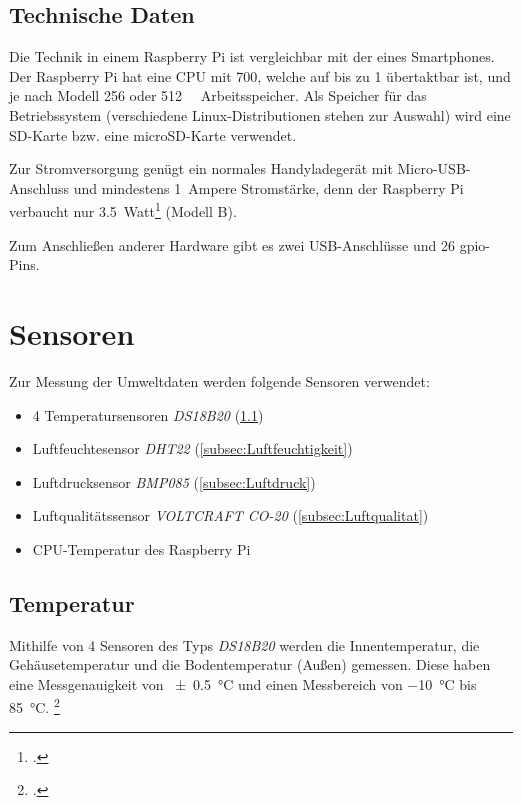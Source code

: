 \subsection{Technische Daten}
\label{subsec:Technische Daten}
Die Technik in einem Raspberry Pi ist vergleichbar mit der eines Smartphones. Der Raspberry Pi hat eine \gls{CPU} mit \SI{700}{}, welche auf bis zu \SI{1}{} übertaktbar ist, und je nach Modell \SI{256}{} oder \SI{512}{\mega\byte} Arbeitsspeicher. Als Speicher für das Betriebssystem (verschiedene Linux-Distributionen stehen zur Auswahl) wird eine SD-Karte bzw. eine microSD-Karte verwendet.

Zur Stromversorgung genügt ein normales Handyladegerät mit Micro-USB-Anschluss und mindestens \SI{1}{\gls{Ampere}} Stromstärke, denn der Raspberry Pi verbaucht nur \SI{3.5}{Watt}\footcite{strom} (Modell B).

Zum Anschließen anderer Hardware gibt es zwei USB-Anschlüsse und 26 \gls{gpio}-Pins.

\section{Sensoren}
\label{sec:Sensoren}

Zur Messung der Umweltdaten werden folgende Sensoren verwendet:
\begin{itemize}
\item 4 Temperatursensoren \emph{DS18B20} (\ref{subsec:Temperatur})
\item Luftfeuchtesensor \emph{DHT22} (\ref{subsec:Luftfeuchtigkeit})
\item Luftdrucksensor \emph{BMP085} (\ref{subsec:Luftdruck})
\item Luftqualitätssensor \emph{VOLTCRAFT CO-20} (\ref{subsec:Luftqualitat})
\item CPU-Temperatur des Raspberry Pi
\end{itemize}
\subsection{Temperatur}
\label{subsec:Temperatur}

Mithilfe von 4 Sensoren des Typs \emph{DS18B20} werden die Innentemperatur, die Gehäusetemperatur und die Bodentemperatur (Außen) gemessen. Diese haben eine Messgenauigkeit von \SI{\pm 0.5}{\degreeCelsius}  und einen Messbereich von \SI{-10}{\degreeCelsius}  bis \SI{+85}{\degreeCelsius}. \footcite[20]{temp}

